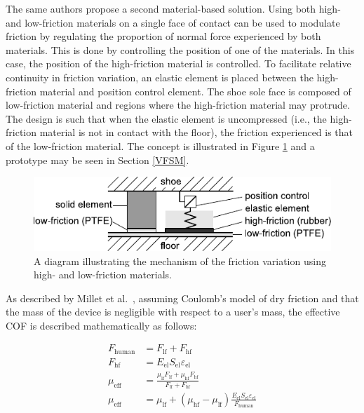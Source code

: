 \documentclass [12pt,letterpaper]{report}
\begin{document}
The same authors propose a second material-based solution. Using both high- and low-friction materials on a single face of contact can be used to modulate friction by regulating the proportion of normal force experienced by both materials. This is done by controlling the position of one of the materials. In this case, the position of the high-friction material is controlled. To facilitate relative continuity in friction variation, an elastic element is placed between the high-friction material and position control element. The shoe sole face is composed of low-friction material and regions where the high-friction material may protrude. The design is such that when the elastic element is uncompressed (i.e., the high-friction material is not in contact with the floor), the friction experienced is that of the low-friction material. The concept is illustrated in Figure \ref{principle} \cite{millet2016design} and a prototype may be seen in Section \ref{VFSM}.

\begin{figure}%
  \centering
  \includegraphics{fig/shoe_principle}
  \caption{A diagram illustrating the mechanism of the friction variation using high- and low-friction materials.}
  \label{principle}
\end{figure}

As described by Millet et al.\ \cite{millet2016design}, assuming Coulomb's model of dry friction and that the mass of the device is negligible with respect to a user's mass, the effective COF is described mathematically as follows:


\begin{align}
  F_\mathrm{human} &= F_\mathrm{lf} + F_\mathrm{hf}\\
  F_\mathrm{hf}    &= E_\mathrm{el} S_\mathrm{el} \varepsilon_\mathrm{el}\\
  \mu_\mathrm{eff} &= \frac{\mu_\mathrm{lf}F_\mathrm{lf}+\mu_\mathrm{hf}F_\mathrm{hf}}{F_\mathrm{lf} + F_\mathrm{hf}}\\
  \mu_\mathrm{eff} &= \mu_\mathrm{lf} + (\mu_\mathrm{hf} - \mu_\mathrm{lf}) \frac{E_\mathrm{el} S_\mathrm{el} \varepsilon_\mathrm{el}}{F_\mathrm{human}}\label{eq:mu}
\end{align}
\end{document}
